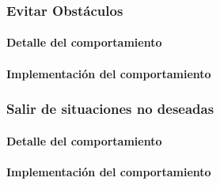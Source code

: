 \subsubsection{Evitar Obst\'aculos}
\label{avoid_obstacles}
\paragraph{Detalle del comportamiento}
\paragraph{Implementaci\'on del comportamiento}

\subsubsection{Salir de situaciones no deseadas}
\label{out_of_unwanted_situations}
\paragraph{Detalle del comportamiento}
\paragraph{Implementaci\'on del comportamiento}


